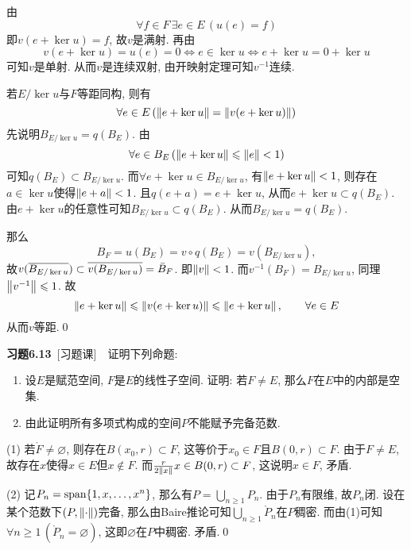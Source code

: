\begin{Proof}
	由
	\[
	\forall f\in F\,\exists e\in E\,(u(e)=f)
	\]
	即$ v(e+\ker u)=f $, 故$ v $是满射. 再由
	\[
	v(e+\ker u)=u(e)=0\Longleftrightarrow e\in\ker u\Longleftrightarrow e+\ker u=0+\ker u
	\]
	可知$ v $是单射. 从而$ v $是连续双射, 由开映射定理可知$ v^{-1} $连续.
	
	若$ E/\ker u $与$ F $等距同构, 则有
	\[
	\forall e\in E\,(\norm{e+\ker u}=\norm{v(e+\ker u)})
	\]
	先说明$ B_{E/\ker u}=q(B_E) $. 由
	\[
	\forall e\in B_E\,(\norm{e+\ker u}\leqslant\norm{e}<1)
	\]
	可知$ q(B_E)\subset B_{E/\ker u} $. 而$ \forall e+\ker u\in B_{E/\ker u} $, 有$ \norm{e+\ker u}<1 $, 则存在$ a\in\ker u $使得$ \norm{e+a}<1 $. 且$ q(e+a)=e+\ker u $, 从而$ e+\ker u\subset q(B_E) $. 由$ e+\ker u $的任意性可知$ B_{E/\ker u}\subset q(B_E) $. 从而$ B_{E/\ker u}=q(B_E) $.
	
	那么
	\[
	B_F=u(B_E)=v\circ q(B_E)=v(B_{E/\ker u}),
	\]
	故$ v(\baro{B_{E/\ker u}})\subset\baro{v(B_{E/\ker u})}=\bar{B}_F $. 即$ \norm{v}<1 $. 而$ v^{-1}(B_F)=B_{E/\ker u} $, 同理$ \norm{v^{-1}}\leqslant 1 $. 故
	\[
	\norm{e+\ker u}\leqslant\norm{v(e+\ker u)}\leqslant\norm{e+\ker u},\qquad \forall e\in E
	\]
	从而$ v $等距.\qed
	\end{Proof}
	
	\textbf{习题6.13}\ [习题课]\ \ 证明下列命题:
	\begin{enumerate}[(1)]
	\item 设$ E $是赋范空间, $ F $是$ E $的线性子空间. 证明: 若$ F\ne E $, 那么$ F $在$ E $中的内部是空集.
	\item 由此证明所有多项式构成的空间$ P $不能赋予完备范数.
	\end{enumerate}
	\begin{Proof}
	(1) 若$ \mathring{F}\ne\varnothing $, 则存在$ B(x_0,r)\subset F $, 这等价于$ x_0\in F $且$ B(0,r)\subset F $. 由于$ F\ne E $, 故存在$ x $使得$ x\in E $但$ x\notin F $. 而$ \frac{r}{2\norm{x}}x\in B(0,r)\subset F $, 这说明$ x\in F $, 矛盾.
	
	(2) 记$ P_n=\Span\{ 1,x,\dots,x^n \} $, 那么有$ P=\bigcup_{n\geqslant 1}P_n $. 由于$ P_n $有限维, 故$ P_n $闭. 设在某个范数下$ (P,\norm{\cdot}) $完备, 那么由Baire推论可知$ \bigcup_{n\geqslant 1}\mathring{P}_n $在$ P $稠密. 而由(1)可知$ \forall n\geqslant 1\,(\mathring{P}_n=\varnothing) $, 这即$ \varnothing $在$ P $中稠密. 矛盾.\qed
	\end{Proof}
	
